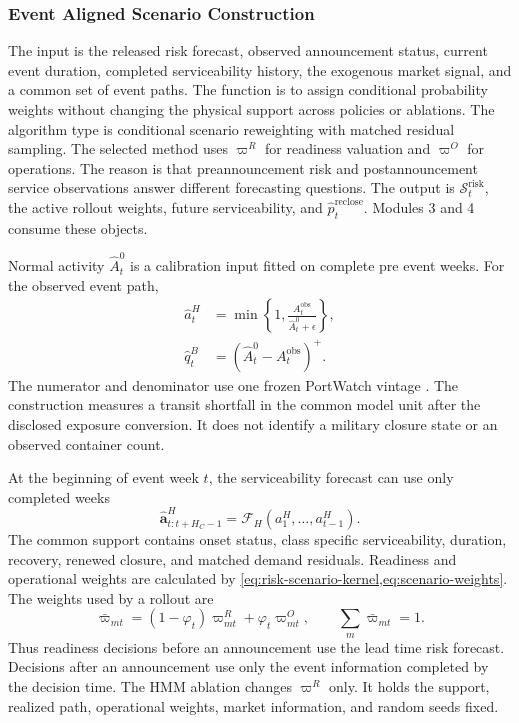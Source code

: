 \documentclass[a4paper,fleqn]{cas-sc}
\newcommand{\pos}[1]{\left(#1\right)^{+}}
\begin{document}
\subsubsection{Event Aligned Scenario Construction}
The input is the released risk forecast, observed announcement status, current
event duration, completed serviceability history, the exogenous market signal,
and a common set of event paths. The function is to assign conditional
probability weights without changing the physical support across policies or
ablations. The algorithm type is conditional scenario reweighting with matched
residual sampling. The selected method uses $\varpi^R$ for readiness valuation
and $\varpi^O$ for operations. The reason is that preannouncement risk and
postannouncement service observations answer different forecasting questions.
The output is $\mathcal S_t^{\mathrm{risk}}$, the active rollout weights,
future serviceability, and $\widehat p_t^{\mathrm{reclose}}$. Modules 3 and 4
consume these objects.

Normal activity $\widehat A_t^0$ is a calibration input fitted on complete
pre event weeks. For the observed event path,
\begin{subequations}\label{eq:event-path-construction}
\begin{align}
 \widehat a_t^H&=\min\left\{1,
 \frac{A_t^{\mathrm{obs}}}{\widehat A_t^0+\epsilon}\right\},\\
 \widehat q_t^B&=\pos{\widehat A_t^0-A_t^{\mathrm{obs}}}.
\end{align}
\end{subequations}
The numerator and denominator use one frozen PortWatch vintage
\citep{IMFPortWatch2023,IMFPortWatchMethod2025}. The construction measures a
transit shortfall in the common model unit after the disclosed exposure
conversion. It does not identify a military closure state or an observed
container count.

At the beginning of event week $t$, the serviceability forecast can use only
completed weeks
\begin{equation}
 \widehat{\boldsymbol a}^{H}_{t:t+H_C-1}
 =\mathcal F_H(a^H_1,\ldots,a^H_{t-1}).
 \label{eq:event-information-clock}
\end{equation}
The common support contains onset status, class specific serviceability,
duration, recovery, renewed closure, and matched demand residuals. Readiness
and operational weights are calculated by
\cref{eq:risk-scenario-kernel,eq:scenario-weights}. The weights used by a
rollout are
\begin{equation}
 \bar\varpi_{mt}
 =(1-\varphi_t)\varpi^R_{mt}+\varphi_t\varpi^O_{mt},
 \qquad \sum_m\bar\varpi_{mt}=1.
 \label{eq:active-scenario-weights}
\end{equation}
Thus readiness decisions before an announcement use the lead time risk
forecast. Decisions after an announcement use only the event information
completed by the decision time. The HMM ablation changes $\varpi^R$ only. It
holds the support, realized path, operational weights, market information, and
random seeds fixed.
\end{document}
